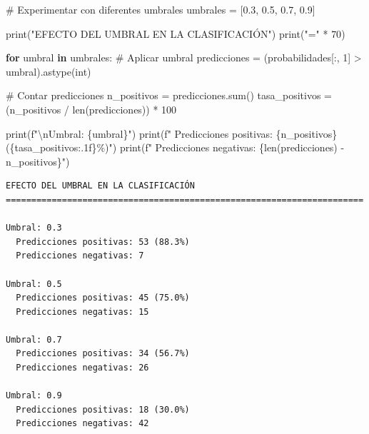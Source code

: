 \documentclass[
  doc,
  floatsintext,
  longtable,
  a4paper,
  nolmodern,
  notxfonts,
  notimes,
  12pt,
  colorlinks=true,linkcolor=blue,citecolor=blue,urlcolor=blue]{apa7}
\newenvironment{Shaded}{\begin{snugshade}}{\end{snugshade}}
\newcommand{\BuiltInTok}[1]{\textcolor[rgb]{0.00,0.23,0.31}{#1}}
\newcommand{\CharTok}[1]{\textcolor[rgb]{0.13,0.47,0.30}{#1}}
\newcommand{\CommentTok}[1]{\textcolor[rgb]{0.37,0.37,0.37}{#1}}
\newcommand{\ControlFlowTok}[1]{\textcolor[rgb]{0.00,0.23,0.31}{\textbf{#1}}}
\newcommand{\DecValTok}[1]{\textcolor[rgb]{0.68,0.00,0.00}{#1}}
\newcommand{\FloatTok}[1]{\textcolor[rgb]{0.68,0.00,0.00}{#1}}
\newcommand{\KeywordTok}[1]{\textcolor[rgb]{0.00,0.23,0.31}{\textbf{#1}}}
\newcommand{\NormalTok}[1]{\textcolor[rgb]{0.00,0.23,0.31}{#1}}
\newcommand{\OperatorTok}[1]{\textcolor[rgb]{0.37,0.37,0.37}{#1}}
\newcommand{\SpecialCharTok}[1]{\textcolor[rgb]{0.37,0.37,0.37}{#1}}
\newcommand{\SpecialStringTok}[1]{\textcolor[rgb]{0.13,0.47,0.30}{#1}}
\newcommand{\StringTok}[1]{\textcolor[rgb]{0.13,0.47,0.30}{#1}}
\begin{document}
\begin{Shaded}
\begin{Highlighting}[]
\CommentTok{\# Experimentar con diferentes umbrales}
\NormalTok{umbrales }\OperatorTok{=}\NormalTok{ [}\FloatTok{0.3}\NormalTok{, }\FloatTok{0.5}\NormalTok{, }\FloatTok{0.7}\NormalTok{, }\FloatTok{0.9}\NormalTok{]}

\BuiltInTok{print}\NormalTok{(}\StringTok{"EFECTO DEL UMBRAL EN LA CLASIFICACIÓN"}\NormalTok{)}
\BuiltInTok{print}\NormalTok{(}\StringTok{"="} \OperatorTok{*} \DecValTok{70}\NormalTok{)}

\ControlFlowTok{for}\NormalTok{ umbral }\KeywordTok{in}\NormalTok{ umbrales:}
    \CommentTok{\# Aplicar umbral}
\NormalTok{    predicciones }\OperatorTok{=}\NormalTok{ (probabilidades[:, }\DecValTok{1}\NormalTok{] }\OperatorTok{\textgreater{}}\NormalTok{ umbral).astype(}\BuiltInTok{int}\NormalTok{)}
    
    \CommentTok{\# Contar predicciones}
\NormalTok{    n\_positivos }\OperatorTok{=}\NormalTok{ predicciones.}\BuiltInTok{sum}\NormalTok{()}
\NormalTok{    tasa\_positivos }\OperatorTok{=}\NormalTok{ (n\_positivos }\OperatorTok{/} \BuiltInTok{len}\NormalTok{(predicciones)) }\OperatorTok{*} \DecValTok{100}
    
    \BuiltInTok{print}\NormalTok{(}\SpecialStringTok{f"}\CharTok{\textbackslash{}n}\SpecialStringTok{Umbral: }\SpecialCharTok{\{}\NormalTok{umbral}\SpecialCharTok{\}}\SpecialStringTok{"}\NormalTok{)}
    \BuiltInTok{print}\NormalTok{(}\SpecialStringTok{f"  Predicciones positivas: }\SpecialCharTok{\{}\NormalTok{n\_positivos}\SpecialCharTok{\}}\SpecialStringTok{ (}\SpecialCharTok{\{}\NormalTok{tasa\_positivos}\SpecialCharTok{:.1f\}}\SpecialStringTok{\%)"}\NormalTok{)}
    \BuiltInTok{print}\NormalTok{(}\SpecialStringTok{f"  Predicciones negativas: }\SpecialCharTok{\{}\BuiltInTok{len}\NormalTok{(predicciones) }\OperatorTok{{-}}\NormalTok{ n\_positivos}\SpecialCharTok{\}}\SpecialStringTok{"}\NormalTok{)}
\end{Highlighting}
\end{Shaded}

\begin{verbatim}
EFECTO DEL UMBRAL EN LA CLASIFICACIÓN
======================================================================

Umbral: 0.3
  Predicciones positivas: 53 (88.3%)
  Predicciones negativas: 7

Umbral: 0.5
  Predicciones positivas: 45 (75.0%)
  Predicciones negativas: 15

Umbral: 0.7
  Predicciones positivas: 34 (56.7%)
  Predicciones negativas: 26

Umbral: 0.9
  Predicciones positivas: 18 (30.0%)
  Predicciones negativas: 42
\end{verbatim}
\end{document}
